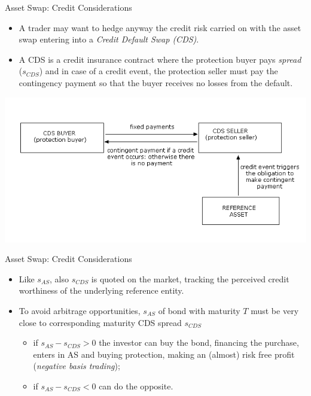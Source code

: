 \documentclass{beamer}
\begin{document}
\begin{frame}{Asset Swap: Credit Considerations}
	\begin {itemize}
	\item A trader may want to hedge anyway the credit risk carried on with the asset swap entering into a \emph{Credit Default Swap (CDS)}.
	\item A CDS is a credit insurance contract where the protection buyer pays \emph{spread} ($s_{CDS}$) and in case of a credit event, the protection seller must pay the contingency payment so that the buyer receives no losses from the default.
	\end{itemize}
\begin{center}
\includegraphics[width=0.7\linewidth]{credit-default-swaps}
\end{center}
\end{frame}

\begin{frame}{Asset Swap: Credit Considerations}
	\begin {itemize}
	\item Like $s_{AS}$, also $s_{CDS}$ is quoted on the market, tracking the perceived credit worthiness of the underlying reference entity.
	\item To avoid arbitrage opportunities, $s_{AS}$ of bond with maturity $T$ must be very close to corresponding maturity CDS spread $s_{CDS}$
	\begin{itemize}
		\item if $s_{AS} - s_{CDS} > 0$ the investor can buy the bond, financing the purchase, enters in AS and buying protection, making an (almost) risk free profit (\emph{negative basis trading});
		\item if $s_{AS} - s_{CDS} < 0$ can do the opposite.
	\end{itemize}
	\end{itemize}
\end{frame}
\end{document}
